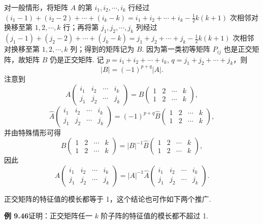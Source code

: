 \documentclass[UTF8,12pt,a4paper,fontset=fandol]{ctexart}
\begin{document}
对一般情形，将矩阵 $A$ 的第 $i_1,i_2,\cdots,i_k$ 行经过 $(i_1-1)+(i_2-2)+\cdots+(i_k-k)=i_1+i_2+\cdots+i_k-\frac12k(k+1)$ 次相邻对换移至第 $1,2,\cdots,k$ 行；再将第 $j_1,j_2,\cdots,j_k$ 列经过 $(j_1-1)+(j_2-2)+\cdots+(j_k-k)=j_1+j_2+\cdots+j_k-\frac12k(k+1)$ 次相邻对换移至第 $1,2,\cdots,k$ 列；得到的矩阵记为 $B$. 因为第一类初等矩阵 $P_{ij}$ 也是正交矩阵，故矩阵 $B$ 仍是正交矩阵. 记 $p=i_1+i_2+\cdots+i_k$, $q=j_1+j_2+\cdots+j_k$，则
\[
|B|=(-1)^{p+q}|A|.
\]
注意到
\[
A\begin{pmatrix}
i_1&i_2&\cdots&i_k\\
j_1&j_2&\cdots&j_k
\end{pmatrix}
=B\begin{pmatrix}
1&2&\cdots&k\\
1&2&\cdots&k
\end{pmatrix},
\]
\[
\widehat{A}\begin{pmatrix}
i_1&i_2&\cdots&i_k\\
j_1&j_2&\cdots&j_k
\end{pmatrix}
=(-1)^{p+q}\widehat{B}\begin{pmatrix}
1&2&\cdots&k\\
1&2&\cdots&k
\end{pmatrix},
\]
并由特殊情形可得
\[
B\begin{pmatrix}
1&2&\cdots&k\\
1&2&\cdots&k
\end{pmatrix}
=|B|^{-1}\widehat{B}\begin{pmatrix}
1&2&\cdots&k\\
1&2&\cdots&k
\end{pmatrix},
\]
因此
\[
A\begin{pmatrix}
i_1&i_2&\cdots&i_k\\
j_1&j_2&\cdots&j_k
\end{pmatrix}
=|A|^{-1}\widehat{A}\begin{pmatrix}
i_1&i_2&\cdots&i_k\\
j_1&j_2&\cdots&j_k
\end{pmatrix}.
\]

正交矩阵的特征值的模长都等于 1，这个结论也可作如下两个推广.

\noindent\textbf{例 9.46}\quad 证明：正交矩阵任一 $k$ 阶子阵的特征值的模长都不超过 1.
\end{document}
